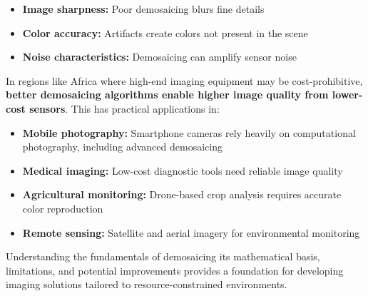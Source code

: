 \documentclass[12pt]{article}
\begin{document}
\begin{itemize}
    \item \textbf{Image sharpness:} Poor demosaicing blurs fine details
    \item \textbf{Color accuracy:} Artifacts create colors not present in the scene
    \item \textbf{Noise characteristics:} Demosaicing can amplify sensor noise
\end{itemize}

In regions like Africa where high-end imaging equipment may be cost-prohibitive, \textbf{better demosaicing algorithms enable higher image quality from lower-cost sensors\cite{niu2018low}}. This has practical applications in:

\begin{itemize}
    \item \textbf{Mobile photography:} Smartphone cameras rely heavily on computational photography, including advanced demosaicing
    \item \textbf{Medical imaging:} Low-cost diagnostic tools need reliable image quality
    \item \textbf{Agricultural monitoring:} Drone-based crop analysis requires accurate color reproduction\cite{sweet2022opportunities}
    \item \textbf{Remote sensing:} Satellite and aerial imagery for environmental monitoring
\end{itemize}

Understanding the fundamentals of demosaicing its mathematical basis, limitations, and potential improvements provides a foundation for developing imaging solutions tailored to resource-constrained environments.



\end{document}
